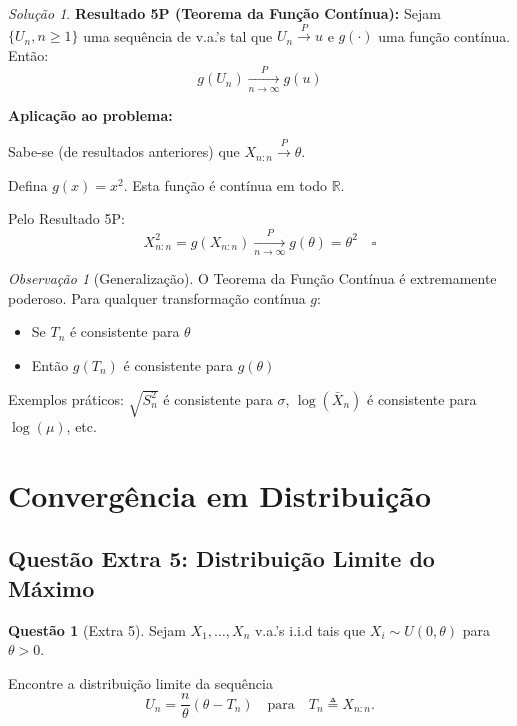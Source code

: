 \documentclass[12pt,a4paper]{article}
\theoremstyle{definition}
\newtheorem{questao}{Questão}[section]
\theoremstyle{remark}
\newtheorem{solucao}{Solução}[section]
\newtheorem{observacao}{Observação}[section]
\begin{document}
\begin{solucao}
\textbf{Resultado 5P (Teorema da Função Contínua):} Sejam $\{U_n, n \geq 1\}$ uma sequência de v.a.'s tal que $U_n \xrightarrow{P} u$ e $g(\cdot)$ uma função contínua. Então:
\[
g(U_n) \xrightarrow[n \to \infty]{P} g(u)
\]

\textbf{Aplicação ao problema:}

Sabe-se (de resultados anteriores) que $X_{n:n} \xrightarrow{P} \theta$.

Defina $g(x) = x^2$. Esta função é contínua em todo $\mathbb{R}$.

Pelo Resultado 5P:
\[
X_{n:n}^2 = g(X_{n:n}) \xrightarrow[n \to \infty]{P} g(\theta) = \theta^2 \quad \square
\]
\end{solucao}

\begin{observacao}[Generalização]
O Teorema da Função Contínua é extremamente poderoso. Para qualquer transformação contínua $g$:
\begin{itemize}
    \item Se $T_n$ é consistente para $\theta$
    \item Então $g(T_n)$ é consistente para $g(\theta)$
\end{itemize}

Exemplos práticos: $\sqrt{S_n^2}$ é consistente para $\sigma$, $\log(\bar{X}_n)$ é consistente para $\log(\mu)$, etc.
\end{observacao}

\section{Convergência em Distribuição}

\subsection{Questão Extra 5: Distribuição Limite do Máximo}

\begin{questao}[Extra 5]
Sejam $X_1, \ldots, X_n$ v.a.'s i.i.d tais que $X_i \sim U(0, \theta)$ para $\theta > 0$. 

Encontre a distribuição limite da sequência
\[
U_n = \frac{n}{\theta} (\theta - T_n) \quad \text{para} \quad T_n \triangleq X_{n:n}.
\]
\end{questao}
\end{document}
